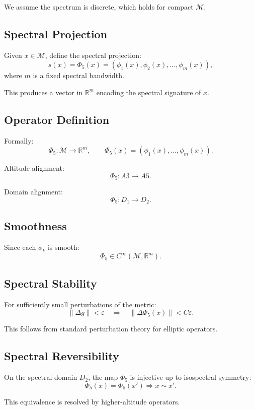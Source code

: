 We assume the spectrum is discrete, which holds for compact $\mathcal{M}$.

\subsection{Spectral Projection}

Given $x \in \mathcal{M}$, define the spectral projection:
\[
s(x) = \Phi_5(x)
= \left( \phi_1(x), \phi_2(x), \dots, \phi_m(x) \right),
\]
where $m$ is a fixed spectral bandwidth.

This produces a vector in $\mathbb{R}^m$ encoding the spectral signature of $x$.

\subsection{Operator Definition}

Formally:
\[
\Phi_5 : \mathcal{M} \to \mathbb{R}^m,
\qquad
\Phi_5(x) = (\phi_1(x), \dots, \phi_m(x)).
\]

Altitude alignment:
\[
\Phi_5 : A3 \to A5.
\]

Domain alignment:
\[
\Phi_5 : D_1 \to D_2.
\]

\subsection{Smoothness}

Since each $\phi_k$ is smooth:
\[
\Phi_5 \in C^\infty(\mathcal{M}, \mathbb{R}^m).
\]

\subsection{Spectral Stability}

For sufficiently small perturbations of the metric:
\[
\| \Delta g \| < \varepsilon
\quad\Longrightarrow\quad
\| \Delta \Phi_5(x) \| < C \varepsilon.
\]

This follows from standard perturbation theory for elliptic operators.

\subsection{Spectral Reversibility}

On the spectral domain $D_2$, the map $\Phi_5$ is injective up to isospectral
symmetry:
\[
\Phi_5(x) = \Phi_5(x') \Rightarrow x \sim x'.
\]

This equivalence is resolved by higher-altitude operators.

